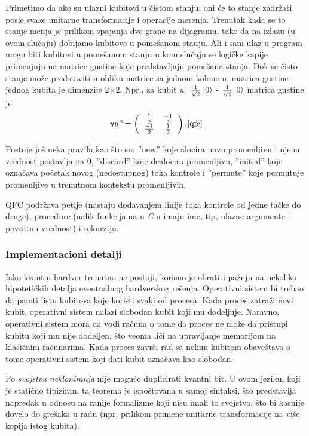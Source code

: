 \documentclass[a4paper]{article}
\begin{document}
{Primetimo da ako su ulazni kubitovi u čistom stanju, oni će to stanje zadržati posle svake unitarne transformacije i operacije merenja. Trenutak kada se to stanje menja je prilikom spajanja dve grane na dijagramu, tako da na izlazu (u ovom slučaju) dobijamo kubitove u pomešanom stanju. Ali i sam ulaz u program mogu biti kubitovi u pomešanom stanju u kom slučaju se logičke kapije primenjuju na matrice gustine koje predstavljaju pomešana stanja. Dok se čisto stanje može predstaviti u obliku matrice sa jednom kolonom, matrica gustine jednog kubita je dimenzije 2$\times$2. Npr., za kubit \textit{u}=$\frac{1}{\sqrt{2}}\ket{0}$ - $\frac{1}{\sqrt{2}}\ket{0}$ 
matrica gustine je \[\textit{uu*}= \left( \begin{array}{cc}
\frac{1}{2} & \frac{-1}{2} \\
\frac{-1}{2} & \frac{1}{2} \\
\end{array} \right).\cite[p.~11]{qfc}\]

Postoje još neka pravila kao što su: ''new'' koje alocira novu promenljivu i njenu vrednost postavlja na 0, ''discard'' koje dealocira promenljivu, ''initial'' koje označava početak novog (nedostupnog) toka kontrole i ''permute'' koje permutuje promenljive u trenutnom kontekstu promenljivih.

QFC podržava petlje (nastaju dodavanjem linije toka kontrole od jedne tačke do druge), procedure (nalik funkcijama u \emph{C}-u imaju ime, tip, ulazne argumente i povratnu vrednost) i rekurziju.

\subsubsection{Implementacioni detalji}

Iako kvantni hardver trenutno ne postoji, korisno je obratiti pažnju na nekoliko hipotetičkih detalja eventualnog hardverskog rešenja. Operativni sistem bi trebao da pamti listu kubitova koje koristi svaki od procesa. Kada proces zatraži novi kubit, operativni sistem nalazi slobodan kubit koji mu dodeljuje. Naravno, operativni sistem mora da vodi računa o tome da proces ne može da pristupi kubitu koji mu nije dodeljen, što veoma liči na upravljanje memorijom na klasičnim računarima. Kada proces završi rad sa nekim kubitom obaveštava o tome operativni sistem koji dati kubit označava kao slobodan.\cite[p. 21]{qfc}

Po \textit{svojstvu nekloniranja} nije moguće duplicirati kvantni bit. U ovom jeziku, koji je statično tipiziran, ta teorema je ispoštovana u samoj sintaksi, što predstavlja napredak u odnosu na ranije formalizme koji nisu imali to svojstvo, što bi kasnije dovelo do grešaka u radu (npr. prilikom primene unitarne transformacije na više kopija istog kubita).

}
\end{document}
